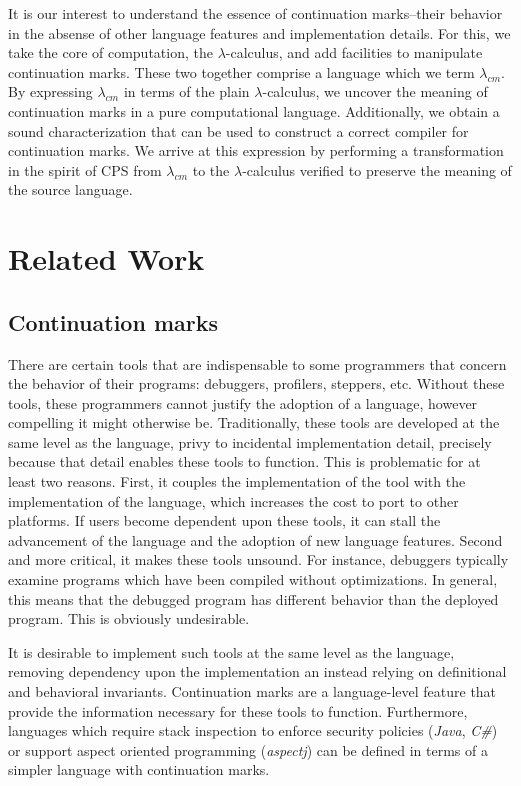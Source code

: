 \documentclass[11pt,ms]{byuprop}
\newcounter{definition}
\begin{document}
It is our interest to understand the essence of continuation marks--their behavior in the
absense of other language features and implementation details. For this, we take the core
of computation, the $\lambda$-calculus, and add facilities to manipulate continuation
marks. These two together comprise a language which we term $\lambda_{cm}$. By expressing
$\lambda_{cm}$ in terms of the plain $\lambda$-calculus, we uncover the meaning of
continuation marks in a pure computational language. Additionally, we obtain a sound
characterization that can be used to construct a correct compiler for continuation marks.
We arrive at this expression by performing a transformation in the spirit of CPS from
$\lambda_{cm}$ to the $\lambda$-calculus verified to preserve the meaning of the source
language.

\section{Related Work}

\subsection{Continuation marks}

There are certain tools that are indispensable to some programmers that concern the
behavior of their programs: debuggers, profilers, steppers, etc. Without these tools,
these programmers cannot justify the adoption of a language, however compelling it might
otherwise be. Traditionally, these tools are developed at the same level as the 
language, privy to incidental implementation detail, precisely because that detail 
enables these tools to function. This is problematic for at least two reasons. First, 
it couples the implementation of the tool with the implementation of the language, which
increases the cost to port to other platforms. If users become dependent upon these tools,
it can stall the advancement of the language and the adoption of new language features.
Second and more critical, it makes these tools unsound. For instance, debuggers typically
examine programs which have been compiled without optimizations. In general, this means 
that the debugged program has different behavior than the deployed program. This is 
obviously undesirable.

It is desirable to implement such tools at the same level as the language, removing
dependency upon the implementation an instead relying on definitional and behavioral
invariants. Continuation marks are a language-level feature that provide the information
necessary for these tools to function. Furthermore, languages which require stack
inspection to enforce security policies (\emph{Java}, \emph{C\#}) or support aspect
oriented programming (\emph{aspectj}) can be defined in terms of a simpler language with
continuation marks.
\end{document}
